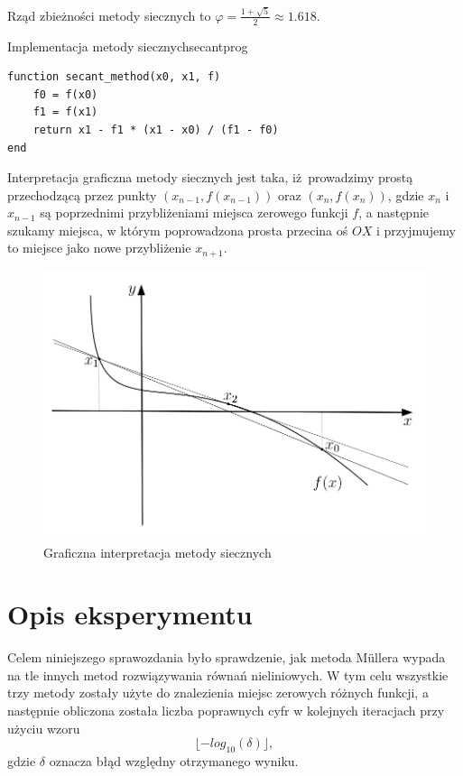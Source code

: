 \documentclass[12pt]{article}
\begin{document}
Rząd zbieżności metody siecznych to $\varphi = \frac{1+\sqrt{5}}{2} 
\approx 1.618$.

\begin{prog}{Implementacja metody siecznych}{secantprog}
\begin{lstlisting}
function secant_method(x0, x1, f)
    f0 = f(x0)
    f1 = f(x1)
    return x1 - f1 * (x1 - x0) / (f1 - f0)
end    
\end{lstlisting}
\end{prog}

Interpretacja graficzna metody siecznych jest taka, iż prowadzimy prostą
przechodzącą przez punkty $(x_{n-1}, f(x_{n-1}))$ oraz $(x_n, f(x_n))$, gdzie
$x_n$ i $x_{n-1}$ są poprzednimi przybliżeniami miejsca zerowego funkcji $f$, a 
następnie szukamy miejsca, w którym poprowadzona prosta przecina oś $OX$ i 
przyjmujemy to miejsce jako nowe przybliżenie $x_{n+1}$.

\begin{figure}[H]
    \centering
    \includegraphics[scale=0.55]{plot_secant.png}
\caption{Graficzna interpretacja metody siecznych}
\label{figure:fig2}
\end{figure}

\section{Opis eksperymentu}

Celem niniejszego sprawozdania było sprawdzenie, jak metoda Müllera wypada na
tle innych metod rozwiązywania równań nieliniowych. W tym celu wszystkie trzy
metody zostały użyte do znalezienia miejsc zerowych różnych funkcji, a następnie
obliczona została liczba poprawnych cyfr w kolejnych iteracjach przy użyciu 
wzoru
\[\lfloor-log_{10}(\delta)\rfloor,\]
gdzie $\delta$ oznacza błąd względny otrzymanego wyniku.
\end{document}
